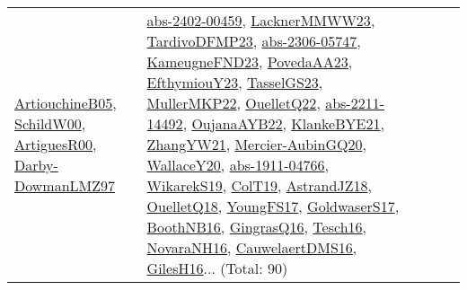 {\begin{longtable}{lp{3cm}>{\raggedright}p{6cm}>{\raggedright}p{6cm}p{8cm}}
\href{papers/ArtiouchineB05.pdf}{ArtiouchineB05}\cite{ArtiouchineB05}, \href{articles/SchildW00.pdf}{SchildW00}\cite{SchildW00}, \href{articles/ArtiguesR00.pdf}{ArtiguesR00}\cite{ArtiguesR00}, \href{articles/Darby-DowmanLMZ97.pdf}{Darby-DowmanLMZ97}\cite{Darby-DowmanLMZ97} & \href{articles/abs-2402-00459.pdf}{abs-2402-00459}\cite{abs-2402-00459}, \href{articles/LacknerMMWW23.pdf}{LacknerMMWW23}\cite{LacknerMMWW23}, \href{papers/TardivoDFMP23.pdf}{TardivoDFMP23}\cite{TardivoDFMP23}, \href{articles/abs-2306-05747.pdf}{abs-2306-05747}\cite{abs-2306-05747}, \href{papers/KameugneFND23.pdf}{KameugneFND23}\cite{KameugneFND23}, \href{papers/PovedaAA23.pdf}{PovedaAA23}\cite{PovedaAA23}, \href{papers/EfthymiouY23.pdf}{EfthymiouY23}\cite{EfthymiouY23}, \href{papers/TasselGS23.pdf}{TasselGS23}\cite{TasselGS23}, \href{articles/MullerMKP22.pdf}{MullerMKP22}\cite{MullerMKP22}, \href{papers/OuelletQ22.pdf}{OuelletQ22}\cite{OuelletQ22}, \href{articles/abs-2211-14492.pdf}{abs-2211-14492}\cite{abs-2211-14492}, \href{papers/OujanaAYB22.pdf}{OujanaAYB22}\cite{OujanaAYB22}, \href{papers/KlankeBYE21.pdf}{KlankeBYE21}\cite{KlankeBYE21}, \href{articles/ZhangYW21.pdf}{ZhangYW21}\cite{ZhangYW21}, \href{papers/Mercier-AubinGQ20.pdf}{Mercier-AubinGQ20}\cite{Mercier-AubinGQ20}, \href{articles/WallaceY20.pdf}{WallaceY20}\cite{WallaceY20}, \href{articles/abs-1911-04766.pdf}{abs-1911-04766}\cite{abs-1911-04766}, \href{articles/WikarekS19.pdf}{WikarekS19}\cite{WikarekS19}, \href{papers/ColT19.pdf}{ColT19}\cite{ColT19}, \href{papers/AstrandJZ18.pdf}{AstrandJZ18}\cite{AstrandJZ18}, \href{papers/OuelletQ18.pdf}{OuelletQ18}\cite{OuelletQ18}, \href{papers/YoungFS17.pdf}{YoungFS17}\cite{YoungFS17}, \href{papers/GoldwaserS17.pdf}{GoldwaserS17}\cite{GoldwaserS17}, \href{papers/BoothNB16.pdf}{BoothNB16}\cite{BoothNB16}, \href{papers/GingrasQ16.pdf}{GingrasQ16}\cite{GingrasQ16}, \href{papers/Tesch16.pdf}{Tesch16}\cite{Tesch16}, \href{articles/NovaraNH16.pdf}{NovaraNH16}\cite{NovaraNH16}, \href{papers/CauwelaertDMS16.pdf}{CauwelaertDMS16}\cite{CauwelaertDMS16}, \href{papers/GilesH16.pdf}{GilesH16}\cite{GilesH16}... (Total: 90)\\

\end{longtable}}
